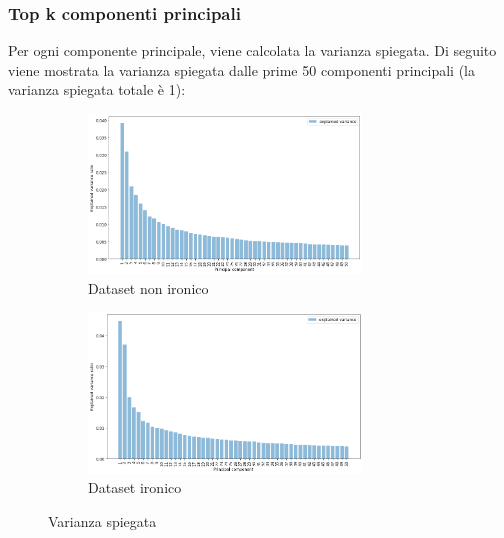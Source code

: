 \documentclass[oneside]{book}
\begin{document}
\subsubsection{Top k componenti principali}
Per ogni componente principale, viene calcolata la varianza spiegata. Di seguito viene mostrata la varianza spiegata dalle prime 50 componenti principali (la varianza spiegata totale è 1):

\begin{figure}[H]
	\begin{subfigure}[H]{0.5 \textwidth}
		\centering
		\includegraphics[width=7.25cm]{assets/pca/non_ironic/var.png}
		\caption{Dataset non ironico}
	\end{subfigure}
	\hfill
	\begin{subfigure}[H]{0.5 \textwidth}
		\centering
		\includegraphics[width=7.25cm]{assets/pca/ironic/var.png}
		\caption{Dataset ironico}
	\end{subfigure}
	\caption{Varianza spiegata}
\end{figure}
\end{document}
